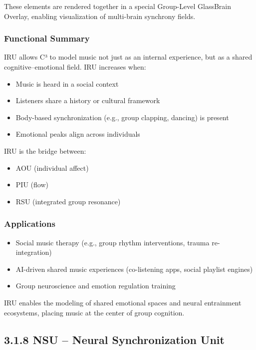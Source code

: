 \documentclass[10pt]{article}
\begin{document}
These elements are rendered together in a special Group-Level GlassBrain Overlay, enabling visualization of multi-brain synchrony fields.

\subsubsection*{Functional Summary}

IRU allows C³ to model music not just as an internal experience, but as a shared cognitive–emotional field. IRU increases when:

\begin{itemize}
    \item Music is heard in a social context
    \item Listeners share a history or cultural framework
    \item Body-based synchronization (e.g., group clapping, dancing) is present
    \item Emotional peaks align across individuals
\end{itemize}

IRU is the bridge between:

\begin{itemize}
    \item AOU (individual affect)
    \item PIU (flow)
    \item RSU (integrated group resonance)
\end{itemize}

\subsubsection*{Applications}

\begin{itemize}
    \item Social music therapy (e.g., group rhythm interventions, trauma re-integration)
    \item AI-driven shared music experiences (co-listening apps, social playlist engines)
    \item Group neuroscience and emotion regulation training
\end{itemize}

IRU enables the modeling of shared emotional spaces and neural entrainment ecosystems, placing music at the center of group cognition.

\subsection*{3.1.8 NSU – Neural Synchronization Unit}
\end{document}
